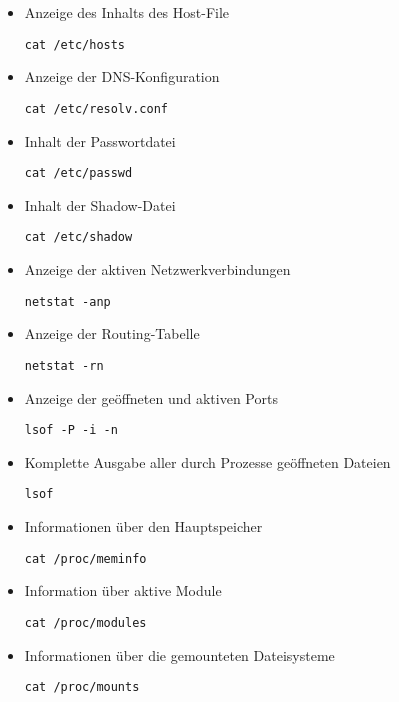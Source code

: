 \begin{itemize}
\item  Anzeige des Inhalts des Host-File
\begin{verbatim}
cat /etc/hosts
\end{verbatim}

\item  Anzeige der DNS-Konfiguration
\begin{verbatim}
cat /etc/resolv.conf
\end{verbatim}

\item  Inhalt der Passwortdatei
\begin{verbatim}
cat /etc/passwd
\end{verbatim}

\item  Inhalt der Shadow-Datei
\begin{verbatim}
cat /etc/shadow
\end{verbatim}

\item  Anzeige der aktiven Netzwerkverbindungen
\begin{verbatim}
netstat -anp
\end{verbatim}

\item  Anzeige der Routing-Tabelle
\begin{verbatim}
netstat -rn
\end{verbatim}

\item Anzeige der geöffneten und aktiven Ports 
\begin{verbatim}
lsof -P -i -n
\end{verbatim}

\item  Komplette Ausgabe aller durch Prozesse geöffneten Dateien
\begin{verbatim}
lsof
\end{verbatim}

\item  Informationen über den Hauptspeicher
\begin{verbatim}
cat /proc/meminfo
\end{verbatim}

\item  Information über aktive Module
\begin{verbatim}
cat /proc/modules
\end{verbatim}

\item  Informationen über die gemounteten Dateisysteme
\begin{verbatim}
cat /proc/mounts
\end{verbatim}


\end{itemize}

